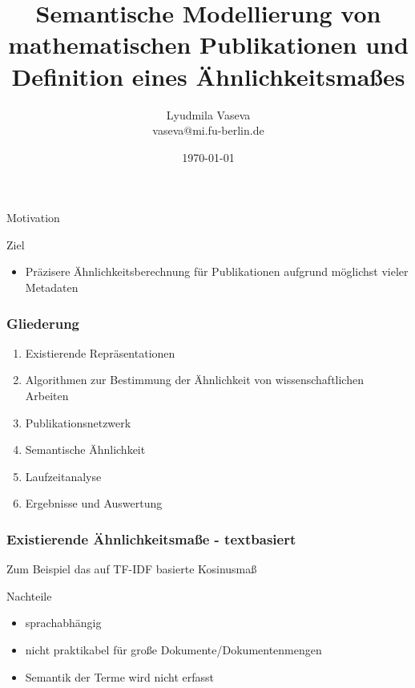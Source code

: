 \documentclass[12pt, xcolor=table]{beamer}
\begin{document}
\title{Semantische Modellierung von mathematischen Publikationen und Definition eines Ähnlichkeitsmaßes}
\author[Lyudmila Vaseva]{Lyudmila Vaseva\\{vaseva@mi.fu-berlin.de}}
\date{\today}

\begin{frame}
	\titlepage
\end{frame}

\begin{frame}
    \begin{block}{Motivation}
%
    \end{block}
    \begin{block}{Ziel}
    \begin{itemize}
    \item Präzisere Ähnlichkeitsberechnung für Publikationen aufgrund möglichst vieler Metadaten
    \end{itemize}
    \end{block}
\end{frame}

\begin{frame}
    \frametitle{Gliederung}
    \begin{enumerate}
        \item Existierende Repräsentationen
        \item Algorithmen zur Bestimmung der Ähnlichkeit von wissenschaftlichen Arbeiten
        \item Publikationsnetzwerk
        \item Semantische Ähnlichkeit
        \item Laufzeitanalyse
        \item Ergebnisse und Auswertung
    \end{enumerate}
\end{frame}


\begin{frame}
    \frametitle{Existierende Ähnlichkeitsmaße - textbasiert}
    Zum Beispiel das auf TF-IDF basierte Kosinusmaß
    \begin{block}{Nachteile}
    \begin{itemize}
        \item sprachabhängig
        \item nicht praktikabel für große Dokumente/Dokumentenmengen
        \item Semantik der Terme wird nicht erfasst
    \end{itemize}
    \end{block}
\end{frame}
\end{document}
